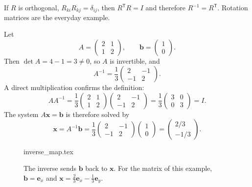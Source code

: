 If $R$ is orthogonal, $R_{ki}R_{kj}=\delta_{ij}$, then $R^{\mathsf T}R=I$ and therefore $R^{-1}=R^{\mathsf T}$. Rotation matrices are the everyday example.

\begin{example}
Let
\begin{equation}
A=\begin{pmatrix}2&1\\1&2\end{pmatrix},\qquad
\mathbf{b}=\begin{pmatrix}1\\0\end{pmatrix}.
\end{equation}
Then $\det A=4-1=3\neq0$, so $A$ is invertible, and
\begin{equation}
A^{-1}=\frac13\begin{pmatrix}2&-1\\-1&2\end{pmatrix}.
\end{equation}
A direct multiplication confirms the definition:
\begin{equation}
AA^{-1}=\frac13\begin{pmatrix}2&1\\1&2\end{pmatrix}
\begin{pmatrix}2&-1\\-1&2\end{pmatrix}
=\frac13\begin{pmatrix}3&0\\0&3\end{pmatrix}=I.
\end{equation}
The system $A\mathbf{x}=\mathbf{b}$ is therefore solved by
\begin{equation}
\mathbf{x}=A^{-1}\mathbf{b}
=\frac13\begin{pmatrix}2&-1\\-1&2\end{pmatrix}
\begin{pmatrix}1\\0\end{pmatrix}
=\begin{pmatrix}2/3\\-1/3\end{pmatrix}.
\end{equation}
\end{example}

\begin{figure}[htb]
    \centering
    {inverse_map.tex}
    \caption{The inverse sends $\mathbf{b}$ back to $\mathbf{x}$. For the matrix of this example, $\mathbf{b}=\mathbf{e}_x$ and $\mathbf{x}=\tfrac23\mathbf{e}_x-\tfrac13\mathbf{e}_y$.}
    \label{fig:vec-inverse-map}
\end{figure}

